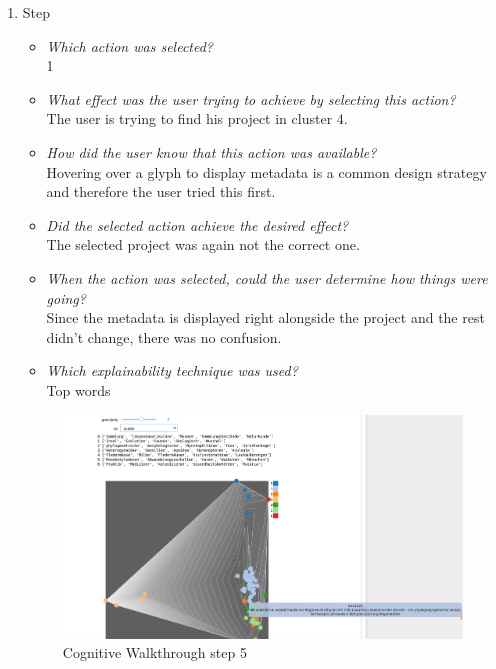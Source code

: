{\begin{enumerate}
		\item Step
		\begin{itemize}
			\item \textit{Which action was selected?} \\
			1
			\item \textit{What effect was the user trying to achieve by selecting this action?} \\
			The user is trying to find his project in cluster 4. 
			\item \textit{How did the user know that this action was available?} \\
			Hovering over a glyph to display metadata is a common design strategy and therefore the user tried this first. 
			\item \textit{Did the selected action achieve the desired effect?} \\
			The selected project was again not the correct one. 
			\item \textit{When the action was selected, could the user determine how things were going?} \\
			Since the metadata is displayed right alongside the project and the rest didn't change, there was no confusion.
			\item \textit{Which explainability technique was used?}\\
			Top words
		\end{itemize}
		\begin{figure}[H]
			\centering
			\includegraphics[width=400px]{../chapters/validation/pics/4_c}
			\caption{\label{pic:step5} Cognitive Walkthrough step 5}
		\end{figure} \newpage
		

\end{enumerate}}
